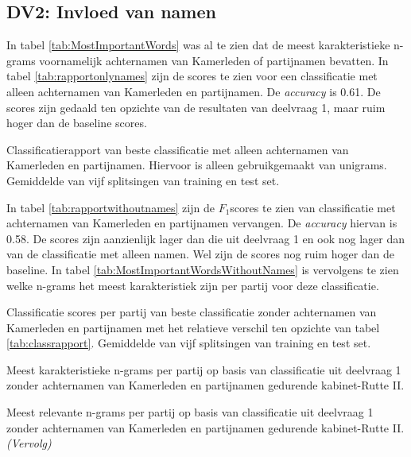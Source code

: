 \subsection{DV2: Invloed van namen}
In tabel \ref{tab:MostImportantWords} was al te zien dat de meest karakteristieke n-grams voornamelijk achternamen van Kamerleden of partijnamen bevatten. In tabel \ref{tab:rapportonlynames} zijn de scores te zien voor een classificatie met alleen achternamen van Kamerleden en partijnamen. De \textit{accuracy} is 0.61. De scores zijn gedaald ten opzichte van de resultaten van deelvraag 1, maar ruim hoger dan de baseline scores.\par
\begin{table}[H]
\caption{Classificatierapport van beste classificatie met alleen achternamen van Kamerleden en partijnamen. Hiervoor is alleen gebruikgemaakt van unigrams. Gemiddelde van vijf splitsingen van training en test set.}
\label{tab:rapportonlynames}
\centering

\end{table}

In tabel \ref{tab:rapportwithoutnames} zijn de $F_1$scores te zien van classificatie met achternamen van Kamerleden en partijnamen vervangen. De \textit{accuracy} hiervan is 0.58. De scores zijn aanzienlijk lager dan die uit deelvraag 1 en ook nog lager dan van de classificatie met alleen namen. Wel zijn de scores nog ruim hoger dan de baseline. In tabel \ref{tab:MostImportantWordsWithoutNames} is vervolgens te zien welke n-grams het meest karakteristiek zijn per partij voor deze classificatie.\par
\begin{table}[H]
\caption{Classificatie scores per partij van beste classificatie zonder achternamen van Kamerleden en partijnamen met het relatieve verschil ten opzichte van tabel \ref{tab:classrapport}. Gemiddelde van vijf splitsingen van training en test set.}
\label{tab:rapportwithoutnames}
\centering

\end{table}

\begin{table}[H] 
\caption{Meest karakteristieke n-grams per partij op basis van classificatie uit deelvraag 1 zonder achternamen van Kamerleden en partijnamen gedurende kabinet-Rutte II.} 
\label{tab:MostImportantWordsWithoutNames} 
\centering
\hspace*{-0.8in}
 
\end{table} 
\addtocounter{table}{-1} 
\begin{table}[H] 
\caption{Meest relevante n-grams per partij op basis van classificatie uit deelvraag 1 zonder achternamen van Kamerleden en partijnamen gedurende kabinet-Rutte II. \emph{(Vervolg)}} 
\centering
\hspace*{-1.3in}
 
\end{table}



